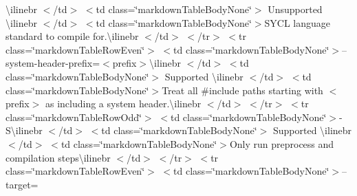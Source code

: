 \begin{longtabu}
{\ttfamily \textbackslash{}ilinebr \texorpdfstring{$<$}{<}/td\texorpdfstring{$>$}{>} \texorpdfstring{$<$}{<}td class=\char`\"{}markdown\+Table\+Body\+None\char`\"{}\texorpdfstring{$>$}{>} Unsupported \textbackslash{}ilinebr \texorpdfstring{$<$}{<}/td\texorpdfstring{$>$}{>} \texorpdfstring{$<$}{<}td class=\char`\"{}markdown\+Table\+Body\+None\char`\"{}\texorpdfstring{$>$}{>}}SYCL language standard to compile for.{\ttfamily \textbackslash{}ilinebr \texorpdfstring{$<$}{<}/td\texorpdfstring{$>$}{>} \texorpdfstring{$<$}{<}/tr\texorpdfstring{$>$}{>} \texorpdfstring{$<$}{<}tr class=\char`\"{}markdown\+Table\+Row\+Even\char`\"{}\texorpdfstring{$>$}{>} \texorpdfstring{$<$}{<}td class=\char`\"{}markdown\+Table\+Body\+None\char`\"{}\texorpdfstring{$>$}{>}}--system-\/header-\/prefix=$<$prefix$>${\ttfamily \textbackslash{}ilinebr \texorpdfstring{$<$}{<}/td\texorpdfstring{$>$}{>} \texorpdfstring{$<$}{<}td class=\char`\"{}markdown\+Table\+Body\+None\char`\"{}\texorpdfstring{$>$}{>} Supported \textbackslash{}ilinebr \texorpdfstring{$<$}{<}/td\texorpdfstring{$>$}{>} \texorpdfstring{$<$}{<}td class=\char`\"{}markdown\+Table\+Body\+None\char`\"{}\texorpdfstring{$>$}{>}}Treat all \#include paths starting with $<$prefix$>$ as including a system header.{\ttfamily \textbackslash{}ilinebr \texorpdfstring{$<$}{<}/td\texorpdfstring{$>$}{>} \texorpdfstring{$<$}{<}/tr\texorpdfstring{$>$}{>} \texorpdfstring{$<$}{<}tr class=\char`\"{}markdown\+Table\+Row\+Odd\char`\"{}\texorpdfstring{$>$}{>} \texorpdfstring{$<$}{<}td class=\char`\"{}markdown\+Table\+Body\+None\char`\"{}\texorpdfstring{$>$}{>}}-\/S{\ttfamily \textbackslash{}ilinebr \texorpdfstring{$<$}{<}/td\texorpdfstring{$>$}{>} \texorpdfstring{$<$}{<}td class=\char`\"{}markdown\+Table\+Body\+None\char`\"{}\texorpdfstring{$>$}{>} Supported \textbackslash{}ilinebr \texorpdfstring{$<$}{<}/td\texorpdfstring{$>$}{>} \texorpdfstring{$<$}{<}td class=\char`\"{}markdown\+Table\+Body\+None\char`\"{}\texorpdfstring{$>$}{>}}Only run preprocess and compilation steps{\ttfamily \textbackslash{}ilinebr \texorpdfstring{$<$}{<}/td\texorpdfstring{$>$}{>} \texorpdfstring{$<$}{<}/tr\texorpdfstring{$>$}{>} \texorpdfstring{$<$}{<}tr class=\char`\"{}markdown\+Table\+Row\+Even\char`\"{}\texorpdfstring{$>$}{>} \texorpdfstring{$<$}{<}td class=\char`\"{}markdown\+Table\+Body\+None\char`\"{}\texorpdfstring{$>$}{>}}--target=


\end{longtabu}
